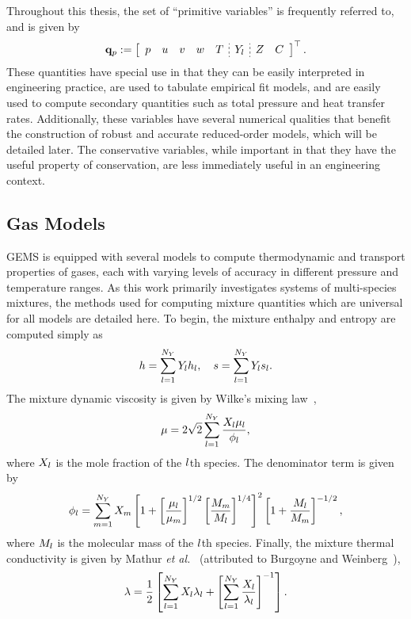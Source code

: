 Throughout this thesis, the set of ``primitive variables'' is frequently referred to, and is given by
%
\begin{equation}\label{eq:gemsPrimVec}
    \primVec \defEq \left[
    \begin{array}{ccccc;{2pt/2pt}c;{2pt/2pt}cc}
    \pressure & \velX & \velY & \velZ & \temperature & \mfSpec & \mixFrac & \progVar
    \end{array}
    \right]^\top.
\end{equation}
%
These quantities have special use in that they can be easily interpreted in engineering practice, are used to tabulate empirical fit models, and are easily used to compute secondary quantities such as total pressure and heat transfer rates. Additionally, these variables have several numerical qualities that benefit the construction of robust and accurate reduced-order models, which will be detailed later. The conservative variables, while important in that they have the useful property of conservation, are less immediately useful in an engineering context.

\subsection{Gas Models}\label{subsec:gasModels}

GEMS is equipped with several models to compute thermodynamic and transport properties of gases, each with varying levels of accuracy in different pressure and temperature ranges. As this work primarily investigates systems of multi-species mixtures, the methods used for computing mixture quantities which are universal for all models are detailed here. To begin, the mixture enthalpy and entropy are computed simply as
%
\begin{equation}
	h = \sum_{l = 1}^{N_Y} Y_{l} h_{l}, \quad s = \sum_{l = 1}^{N_Y} Y_{l} s_{l}.
\end{equation}
%
The mixture dynamic viscosity is given by Wilke's mixing law~\cite{Wilke1950},
%
\begin{equation}\label{eq:viscMix}
	\mu = 2 \sqrt{2} \sum_{l = 1}^{N_Y} \frac{X_{l} \mu_{l}}{\phi_{l}},
\end{equation}
%
where $X_{l}$ is the mole fraction of the $l$th species. The denominator term is given by
%
\begin{equation}\label{eq:viscMixDenom}
	\phi_{l} = \sum_{m = 1}^{N_Y} X_{m} \left[ 1 + \left[ \frac{\mu_{l}}{\mu_{m}} \right]^{1/2} \left[ \frac{M_{m}}{M_{l}} \right]^{1/4} \right]^2 \left[ 1 + \frac{M_{l}}{M_{m}} \right]^{-1/2},
\end{equation}
%
where $M_{l}$ is the molecular mass of the $l$th species. Finally, the mixture thermal conductivity is given by Mathur \textit{et al.}~\cite{Mathur1967} (attributed to Burgoyne and Weinberg~\cite{Burgoyne1952}),
%
\begin{equation}\label{eq:thermCondMix}
    \lambda = \frac{1}{2} \left[ \sum_{l = 1}^{N_Y} X_{l} \lambda_{l} + \left[\sum_{l = 1}^{N_Y} \frac{X_{l}}{\lambda_{l}} \right]^{-1} \right].
\end{equation}


